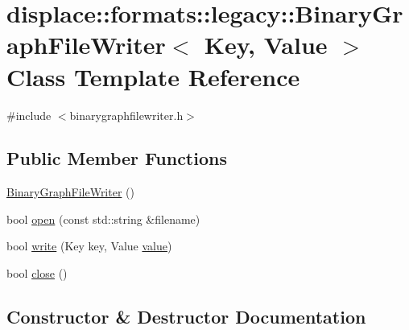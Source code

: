 \hypertarget{classdisplace_1_1formats_1_1legacy_1_1_binary_graph_file_writer}{}\section{displace\+::formats\+::legacy\+::Binary\+Graph\+File\+Writer$<$ Key, Value $>$ Class Template Reference}
\label{classdisplace_1_1formats_1_1legacy_1_1_binary_graph_file_writer}


{\ttfamily \#include $<$binarygraphfilewriter.\+h$>$}

\subsection*{Public Member Functions}
\begin{DoxyCompactItemize}
\item 
\mbox{\hyperlink{classdisplace_1_1formats_1_1legacy_1_1_binary_graph_file_writer_a0e14e93eb7c26b0a0a166ade4c55b4ce}{Binary\+Graph\+File\+Writer}} ()
\item 
bool \mbox{\hyperlink{classdisplace_1_1formats_1_1legacy_1_1_binary_graph_file_writer_a6714cf902afbe448e5fd550b895ad715}{open}} (const std\+::string \&filename)
\item 
bool \mbox{\hyperlink{classdisplace_1_1formats_1_1legacy_1_1_binary_graph_file_writer_ab0d6d7d7aa0130e3bff9930a15faee9a}{write}} (Key key, Value \mbox{\hyperlink{diffusion_8cpp_a4b41795815d9f3d03abfc739e666d5da}{value}})
\item 
bool \mbox{\hyperlink{classdisplace_1_1formats_1_1legacy_1_1_binary_graph_file_writer_a17618fd9c7ae6fd1821c875882b9d5ef}{close}} ()
\end{DoxyCompactItemize}


\subsection{Constructor \& Destructor Documentation}
\mbox{\label{classdisplace_1_1formats_1_1legacy_1_1_binary_graph_file_writer_a0e14e93eb7c26b0a0a166ade4c55b4ce}} 
